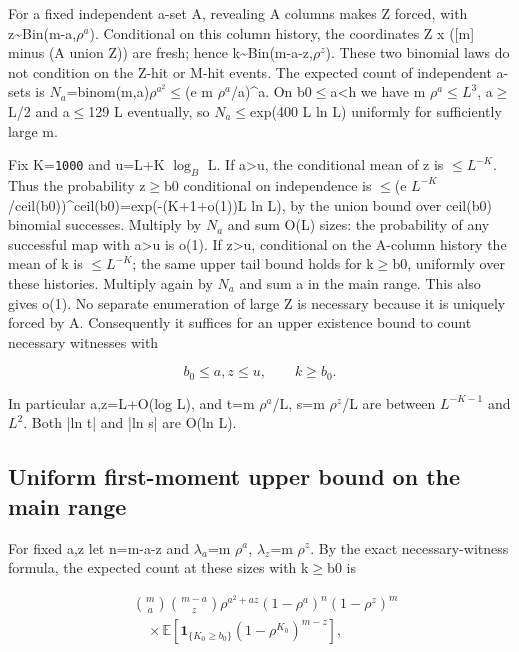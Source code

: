 \documentclass[11pt]{article}
\begin{document}
For a fixed independent a-set A, revealing A columns makes Z forced, with z\textasciitilde{}Bin(m-a,$\rho^{a}$). Conditional on this column history, the coordinates Z x ([m] minus (A union Z)) are fresh; hence k\textasciitilde{}Bin(m-a-z,$\rho^{z}$). These two binomial laws do not condition on the Z-hit or M-hit events. The expected count of independent a-sets is $N_{a}$=binom(m,a)$\rho^{a^2}$\ensuremath{\leq}(e m $\rho^{a}$/a)\textasciicircum{}a. On b0\ensuremath{\leq}a<h we have m $\rho^{a}$\ensuremath{\leq}$L^{3}$, a\ensuremath{\geq}L/2 and a\ensuremath{\leq}129 L eventually, so $N_{a}$\ensuremath{\leq}exp(400 L ln L) uniformly for sufficiently large m.

Fix K=\texttt{1000} and u=L+K $\log_B$ L. If a>u, the conditional mean of z is \ensuremath{\leq}$L^{-K}$. Thus the probability z\ensuremath{\geq}b0 conditional on independence is \ensuremath{\leq}(e $L^{-K}$/ceil(b0))\textasciicircum{}ceil(b0)=exp(-(K+1+o(1))L ln L), by the union bound over ceil(b0) binomial successes. Multiply by $N_{a}$ and sum O(L) sizes: the probability of any successful map with a>u is o(1). If z>u, conditional on the A-column history the mean of k is \ensuremath{\leq}$L^{-K}$; the same upper tail bound holds for k\ensuremath{\geq}b0, uniformly over these histories. Multiply again by $N_{a}$ and sum a in the main range. This also gives o(1). No separate enumeration of large Z is necessary because it is uniquely forced by A. Consequently it suffices for an upper existence bound to count necessary witnesses with

\[
b_0\leq a,z\leq u,\qquad k\geq b_0.\tag{1}
\]

In particular a,z=L+O(log L), and t=m $\rho^{a}$/L, s=m $\rho^{z}$/L are between $L^{-K-1}$ and $L^{2}$. Both |ln t| and |ln s| are O(ln L).

\subsection{Uniform first-moment upper bound on the main range}

For fixed a,z let n=m-a-z and $\lambda_{a}$=m $\rho^{a}$, $\lambda_{z}$=m $\rho^{z}$. By the exact necessary-witness formula, the expected count at these sizes with k\ensuremath{\geq}b0 is

\[
\begin{aligned}&\binom ma\binom{m-a}{z}\rho^{a^2+az}(1-\rho^a)^n(1-\rho^z)^m\\
&\quad{}\times\mathbb E[\mathbf1_{\{K_0\geq b_0\}}(1-\rho^{K_0})^{m-z}],
\end{aligned}
\]
\end{document}
